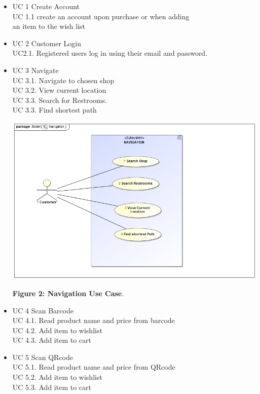 \documentclass{article}
\begin{document}
\begin{itemize}
    \item[] UC 1 Create Account \\
     \setlength{\parindent}{24pt}
     \indent UC 1.1 create an account upon purchase or when adding \\ 
     \indent an item to the wish list
     
    \item[] UC 2 Customer Login \\
      \indent UC2.1. Registered users log in using their email and password.
    
    \item[] UC 3 Navigate  \\
     \indent UC 3.1. Navigate to chosen shop \\
     \indent UC 3.2. View current location \\
     \indent UC 3.3. Search for Restrooms. \\
     \indent UC 3.3. Find shortest path
     
\includegraphics[scale=0.5]{Navigation.jpg}
\begin{center}
    \textbf{Figure 2: Navigation Use Case}. 
\end{center}
     
    \item[] UC 4 Scan Barcode \\
     \indent UC 4.1. Read product name and price from barcode \\
     \indent UC 4.2. Add item to wishlist \\
     \indent UC 4.3. Add item to cart \\
     
    \item[] UC 5 Scan QRcode \\
     \indent UC 5.1. Read product name and price from QRcode \\
     \indent UC 5.2. Add item to wishlist \\
     \indent UC 5.3. Add item to cart \\
    

\end{itemize}
\end{document}
